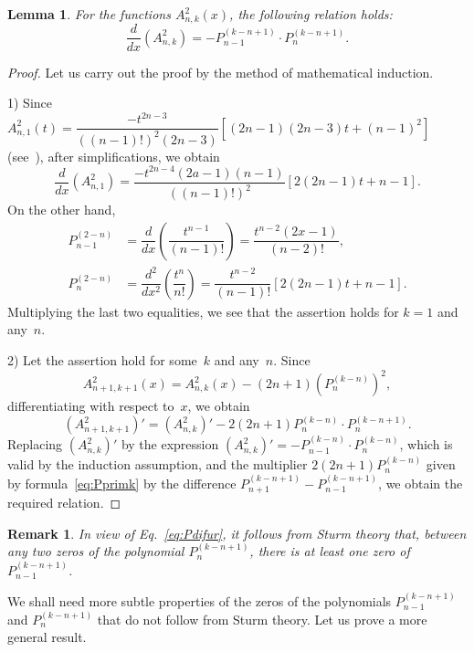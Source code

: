 \documentclass[12pt,oneside]{amsproc}
\numberwithin{equation}{section}
\newtheorem{lem}{Lemma}[section]
\newtheorem{rim}{Remark}[section]
\begin{document}
\begin{lem}
\label{lem:APP}
 For the functions
$A^2_{n,k}(x)$,
the following relation holds{\rm:}
$$
\dfrac{d}{dx}(A^2_{n,k})=-P_{n-1}^{(k-n+1)}\cdot P_{n}^{(k-n+1)}.
$$
\end{lem}

\begin{proof}
 Let us carry out the proof by the method of mathematical induction.

1) Since $A^2_{n,1}(t)=\dfrac{-t^{2n-3}}{((n-1)!)^2
(2n-3)}\left[(2n-1)(2n-3)t+(n-1)^2\right]$
(see~\cite{GarmSh}),
after simplifications,
we obtain
$$
\dfrac{d}{dx}(A^2_{n,1})=\dfrac{-t^{2n-4}(2a-1)(n-1)}{((n-1)!)^2}\left[2(2n-1)t+n-1\right].
$$
 On the other hand,
\begin{align*}
P_{n-1}^{(2-n)}&=\dfrac{d}{dx}\left(\dfrac{t^{n-1}}{(n-1)!}\right)=\dfrac{t^{n-2}(2x-1)}{(n
-2)!},
\\
P_{n}^{(2-n)}&=\dfrac{d^2}{dx^2}\left(\dfrac{t^{n}}{n!}\right)=
\dfrac{t^{n-2}}{(n-1)!}\left[2(2n-1)t+n-1\right].
\end{align*}
 Multiplying the last two equalities,
we see that the assertion holds
for
$k=1$
and any~$n$.

2) Let the assertion hold
for some~$k$ and any~$n$.
 Since
$$
A^2_{n+1,k+1}(x)=A^2_{n,k}(x)-(2n+1)\left(P_n^{(k-n)}\right)^2,
$$
differentiating with respect to~$x$,
we obtain
$$
(A^2_{n+1,k+1})'=(A^2_{n,k})'-2(2n+1)P_n^{(k-n)}\cdot P_n^{(k-n+1)}.
$$
 Replacing $(A^2_{n,k})'$
by  the expression
$(A^2_{n,k})'=-P_{n-1}^{(k-n)}\cdot P_{n}^{(k-n)}$,
which is valid by the induction assumption,
and the multiplier
$2(2n+1) P_n^{(k-n)}$
given by formula~\eqref{eq:Pprimk}
by the difference
$P_{n+1}^{(k-n+1)}-P_{n-1}^{(k-n+1)}$,
we obtain the required relation.
\end{proof}

\begin{rim}
\label{rim}
 In view of Eq.~\eqref{eq:Pdifur},
it follows from Sturm theory that,
between any two zeros of the polynomial
$P_{n}^{(k-n+1)}$,
there is at least one zero of
$P_{n-1}^{(k-n+1)}$.
\end{rim}

 We shall need more subtle properties of the zeros of the polynomials
$P_{n-1}^{(k-n+1)}$
and
$P_{n}^{(k-n+1)}$
that do not follow from Sturm theory.
 Let us prove a more general result.
\end{document}
